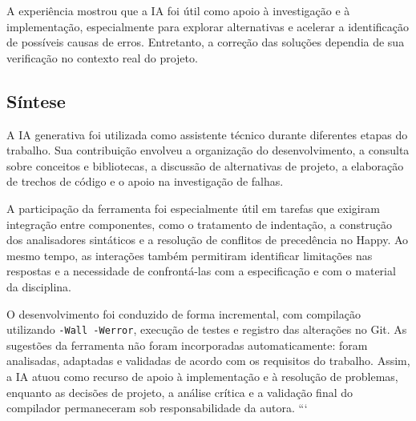A experiência mostrou que a IA foi útil como apoio
à investigação e à implementação, especialmente para
explorar alternativas e acelerar a identificação de
possíveis causas de erros. Entretanto, a correção das
soluções dependia de sua verificação no contexto real
do projeto.

\subsection{Síntese}

A IA generativa foi utilizada como assistente técnico
durante diferentes etapas do trabalho. Sua contribuição
envolveu a organização do desenvolvimento, a consulta
sobre conceitos e bibliotecas, a discussão de alternativas
de projeto, a elaboração de trechos de código e o apoio
na investigação de falhas.

A participação da ferramenta foi especialmente útil
em tarefas que exigiram integração entre componentes,
como o tratamento de indentação, a construção dos
analisadores sintáticos e a resolução de conflitos
de precedência no Happy. Ao mesmo tempo, as interações
também permitiram identificar limitações nas respostas
e a necessidade de confrontá-las com a especificação
e com o material da disciplina.

O desenvolvimento foi conduzido de forma incremental,
com compilação utilizando \texttt{-Wall -Werror},
execução de testes e registro das alterações no Git.
As sugestões da ferramenta não foram incorporadas
automaticamente: foram analisadas, adaptadas e
validadas de acordo com os requisitos do trabalho.
Assim, a IA atuou como recurso de apoio à implementação
e à resolução de problemas, enquanto as decisões de
projeto, a análise crítica e a validação final do
compilador permaneceram sob responsabilidade da autora.
```